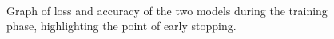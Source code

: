 \begin{figure}[htbp]
    \centering
    \\
    \caption{Graph of loss and accuracy of the two models during the training phase, highlighting the point of early stopping.}
    \label{fig:epochs}
\end{figure}